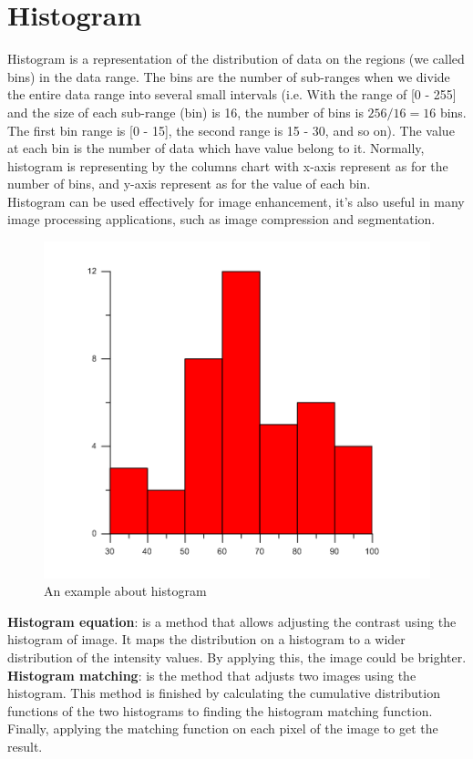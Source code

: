 \section{Histogram}
Histogram is a representation of the distribution of data on the regions (we called bins) in the data range. The bins are the number of sub-ranges when we divide the entire data range into several small intervals (i.e. With the range of [0 - 255] and the size of each sub-range (bin) is 16, the number of bins is $256/16 = 16$ bins. The first bin range is [0 - 15], the second range is {15 - 30}, and so on). The value at each bin is the number of data which have value belong to it. Normally, histogram is representing by the columns chart with x-axis represent as for the number of bins, and y-axis represent as for the value of each bin.\\
Histogram can be used effectively for image enhancement, it's also useful in many image processing applications, such as image compression and segmentation.\\[0.3cm]
\begin{figure}[h!]
\centering
\includegraphics[scale=2]{images/histogram}
\caption{An example about histogram}
\label{fig:figure_31}
\end{figure}
\textbf{Histogram equation}: is a method that allows adjusting the contrast using the histogram of image. It maps the distribution on a histogram to a wider distribution of the intensity values. By applying this, the image could be brighter.\\[0.2cm]
\textbf{Histogram matching}: is the method that adjusts two images using the histogram. This method is finished by calculating the cumulative distribution functions of the two histograms to finding the histogram matching function. Finally, applying the matching function on each pixel of the image to get the result.
